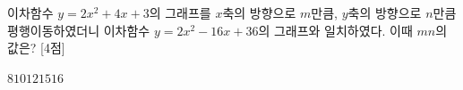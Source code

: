 이차함수 $y=2x^2+4x+3$의 그래프를 $x$축의 방향으로 $m$만큼, $y$축의 방향으로 $n$만큼 평행이동하였더니 이차함수 $y=2x^2-16x+36$의 그래프와 일치하였다. 이때 $mn$의 값은? \mbox{[4점]}
\begin{choices32}{$8$}{$10$}{$12$}{$15$}{$16$}\end{choices32}
